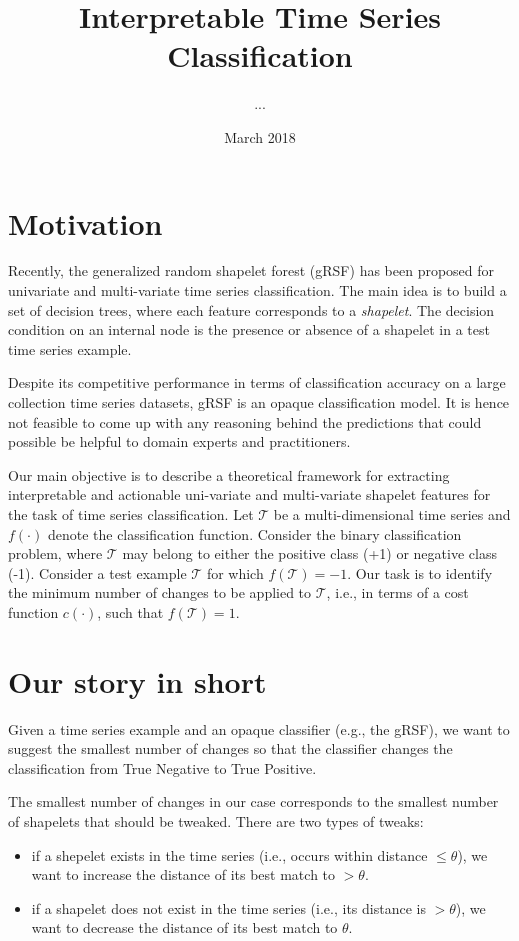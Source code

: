 \documentclass[smallextended,natbib]{svjour3}
\title{Interpretable Time Series Classification}
\author{...}
\date{March 2018}
\begin{document}
\maketitle

\section{Motivation}
Recently, the generalized random shapelet forest (gRSF) \citep{KarlssonPB16} has been proposed for univariate and multi-variate time series classification. The main idea is to build a set of decision trees, where each feature corresponds to a \emph{shapelet}. The decision condition on an internal node is the presence or absence of a shapelet in a test time series example.

Despite its competitive performance in terms of classification accuracy on a large collection time series datasets, gRSF is an opaque classification model. It is hence not feasible to come up with any reasoning behind the predictions that could possible be helpful to domain experts and practitioners.

Our main objective is to describe a theoretical framework for extracting interpretable and actionable uni-variate and multi-variate shapelet features for the task of time series classification. Let $\mathcal{T}$ be a multi-dimensional time series and $f(\cdot)$ denote the classification function. Consider the binary classification problem, where $\mathcal{T}$ may belong to either the positive class (+1) or negative class (-1). Consider a test example $\mathcal{T}$ for which $f(\mathcal{T}) = -1$. Our task is to identify the minimum number of changes to be applied to $\mathcal{T}$, i.e., in terms of a cost function $c(\cdot)$, such that $f(\mathcal{T}) = 1$.

\section{Our story in short}
Given a time series example and an opaque classifier (e.g., the gRSF), we want to suggest the smallest number of changes so that the classifier changes the classification from True Negative to True Positive. 

The smallest number of changes in our case corresponds to the smallest number of shapelets that should be tweaked.  There are two types of tweaks:
\begin{itemize}
\item if a shepelet exists in the time series (i.e., occurs within distance $\leq \theta$), we want to increase the distance of its best match to $> \theta$.
\item if a shapelet does not exist in the time series (i.e., its distance is $> \theta$), we want to decrease the distance of its best match to $\theta$.
\end{itemize}
\end{document}
